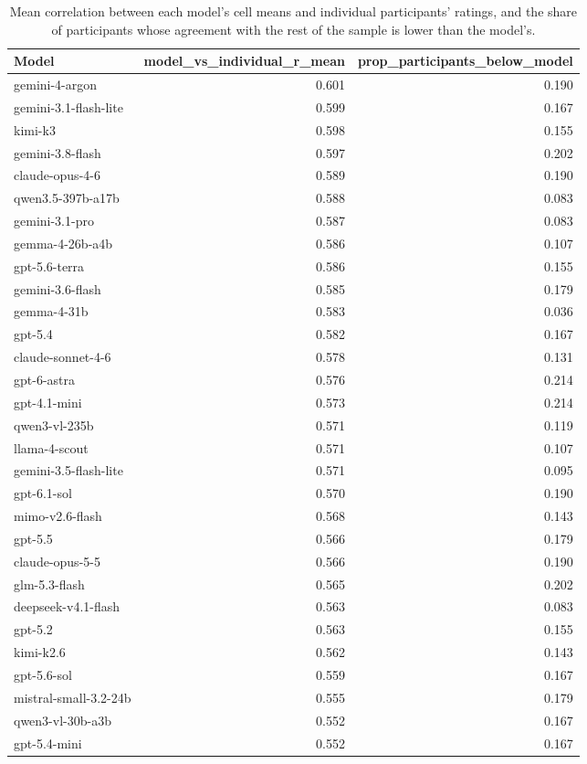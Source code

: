 \begin{table}
\caption{Mean correlation between each model's cell means and individual participants' ratings, and the share of participants whose agreement with the rest of the sample is lower than the model's.}
\begin{tabular}{lrr}
\toprule
Model & model\_vs\_individual\_r\_mean & prop\_participants\_below\_model \\
\midrule
gemini-4-argon & 0.601 & 0.190 \\
gemini-3.1-flash-lite & 0.599 & 0.167 \\
kimi-k3 & 0.598 & 0.155 \\
gemini-3.8-flash & 0.597 & 0.202 \\
claude-opus-4-6 & 0.589 & 0.190 \\
qwen3.5-397b-a17b & 0.588 & 0.083 \\
gemini-3.1-pro & 0.587 & 0.083 \\
gemma-4-26b-a4b & 0.586 & 0.107 \\
gpt-5.6-terra & 0.586 & 0.155 \\
gemini-3.6-flash & 0.585 & 0.179 \\
gemma-4-31b & 0.583 & 0.036 \\
gpt-5.4 & 0.582 & 0.167 \\
claude-sonnet-4-6 & 0.578 & 0.131 \\
gpt-6-astra & 0.576 & 0.214 \\
gpt-4.1-mini & 0.573 & 0.214 \\
qwen3-vl-235b & 0.571 & 0.119 \\
llama-4-scout & 0.571 & 0.107 \\
gemini-3.5-flash-lite & 0.571 & 0.095 \\
gpt-6.1-sol & 0.570 & 0.190 \\
mimo-v2.6-flash & 0.568 & 0.143 \\
gpt-5.5 & 0.566 & 0.179 \\
claude-opus-5-5 & 0.566 & 0.190 \\
glm-5.3-flash & 0.565 & 0.202 \\
deepseek-v4.1-flash & 0.563 & 0.083 \\
gpt-5.2 & 0.563 & 0.155 \\
kimi-k2.6 & 0.562 & 0.143 \\
gpt-5.6-sol & 0.559 & 0.167 \\
mistral-small-3.2-24b & 0.555 & 0.179 \\
qwen3-vl-30b-a3b & 0.552 & 0.167 \\
gpt-5.4-mini & 0.552 & 0.167 \\

\end{tabular}
\end{table}
